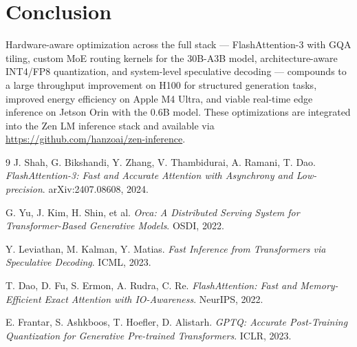 \documentclass[11pt,a4paper]{article}
\begin{document}
\section{Conclusion}
\label{sec:conclusion}

Hardware-aware optimization across the full stack — FlashAttention-3 with GQA tiling,
custom MoE routing kernels for the 30B-A3B model, architecture-aware INT4/FP8
quantization, and system-level speculative decoding — compounds to a large throughput
improvement on H100 for structured generation tasks, improved energy efficiency on Apple
M4 Ultra, and viable real-time edge inference on Jetson Orin with the 0.6B model. These
optimizations are integrated into the Zen LM inference stack and available via
\url{https://github.com/hanzoai/zen-inference}.

\begin{thebibliography}{9}
J. Shah, G. Bikshandi, Y. Zhang, V. Thambidurai, A. Ramani, T. Dao.
\textit{FlashAttention-3: Fast and Accurate Attention with Asynchrony and Low-precision}.
arXiv:2407.08608, 2024.

G. Yu, J. Kim, H. Shin, et al.
\textit{Orca: A Distributed Serving System for Transformer-Based Generative Models}.
OSDI, 2022.

Y. Leviathan, M. Kalman, Y. Matias.
\textit{Fast Inference from Transformers via Speculative Decoding}.
ICML, 2023.

T. Dao, D. Fu, S. Ermon, A. Rudra, C. Re.
\textit{FlashAttention: Fast and Memory-Efficient Exact Attention with IO-Awareness}.
NeurIPS, 2022.

E. Frantar, S. Ashkboos, T. Hoefler, D. Alistarh.
\textit{GPTQ: Accurate Post-Training Quantization for Generative Pre-trained Transformers}.
ICLR, 2023.
\end{thebibliography}
\end{document}
